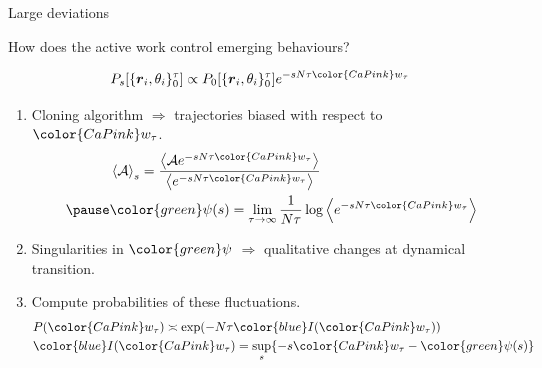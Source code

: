 \documentclass{beamer}
\begin{document}
\begin{frame}{Large deviations}


\vspace{-15pt}
\begin{center}
How does the active work control emerging behaviours?
\end{center}
\vspace{-10pt}

\pause
\begin{equation}
P_s[\{\boldsymbol{r}_i, \theta_i\}_0^{\tau}] \propto P_0[\{\boldsymbol{r}_i, \theta_i\}_0^{\tau}] e^{-s N \tau {\color{CaPink} w_{\tau}}}
\end{equation}
\vspace{-5pt}

\pause
\begin{enumerate}
  \item Cloning algorithm $\Rightarrow$ trajectories biased with respect to $\color{CaPink} w_{\tau}$.
\pause
\begin{eqnarray}
& \left<\mathcal{A}\right>_s = \frac{\left<\mathcal{A}e^{-s N \tau {\color{CaPink} w_{\tau}}}\right>}{\left<e^{-s N \tau {\color{CaPink} w_{\tau}}}\right>}\\ \pause
& {\color{green} \psi}(s) = \lim_{\tau \to \infty} \frac{1}{N\tau} \log\left<e^{-s N \tau {\color{CaPink} w_{\tau}}}\right>
\end{eqnarray}
  \pause
  \vspace{-5pt}
  \item Singularities in $\color{green} \psi$ $\Rightarrow$ qualitative changes at dynamical transition.
  \pause
  \item Compute probabilities of these fluctuations.
  \begin{eqnarray}
  & P({\color{CaPink} w_{\tau}}) \asymp \exp(-N \tau {\color{blue} I}({\color{CaPink} w_{\tau}}))\\
  & {\color{blue} I}({\color{CaPink} w_{\tau}}) = \sup_s \{-s {\color{CaPink} w_{\tau}} - {\color{green} \psi}(s)\}
  \end{eqnarray}
\end{enumerate}


\end{frame}
\end{document}
